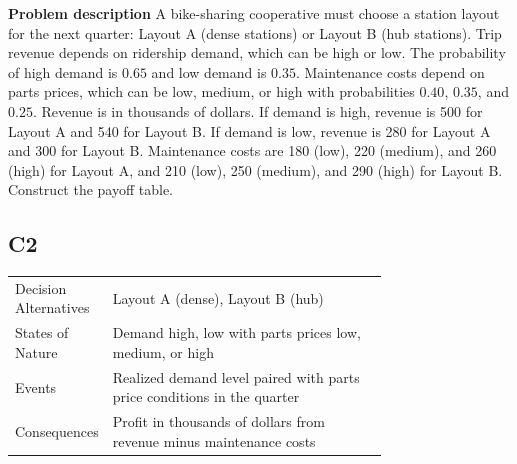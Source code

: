 \begin{ExamProblems}
		\item
		\textbf{Problem description}
		A bike-sharing cooperative must choose a station layout for the next quarter: Layout A (dense stations)
		or Layout B (hub stations). Trip revenue depends on ridership demand, which can be high or low.
		The probability of high demand is $0.65$ and low demand is $0.35$. Maintenance costs depend on parts prices,
		which can be low, medium, or high with probabilities $0.40$, $0.35$, and $0.25$. Revenue is in thousands of dollars.
		If demand is high, revenue is 500 for Layout A and 540 for Layout B. If demand is low, revenue is 280 for Layout A
		and 300 for Layout B. Maintenance costs are 180 (low), 220 (medium), and 260 (high) for Layout A, and 210 (low),
		250 (medium), and 290 (high) for Layout B. Construct the payoff table.
		
		\subsection*{C2}
		\begin{center}
			\begin{tabular}{l p{0.74\linewidth}}
				\toprule
				Decision Alternatives & Layout A (dense), Layout B (hub) \\
				States of Nature & Demand high, low with parts prices low, medium, or high \\
				Events & Realized demand level paired with parts price conditions in the quarter \\
				Consequences & Profit in thousands of dollars from revenue minus maintenance costs \\
				\bottomrule
			\end{tabular}
		\end{center}

\end{ExamProblems}
